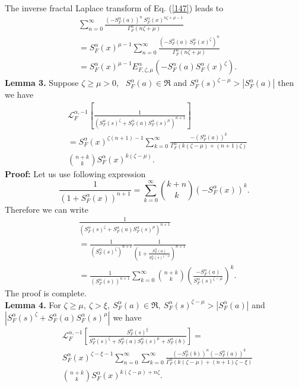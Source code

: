 \documentclass[12pt]{article}
\begin{document}
The inverse fractal Laplace transform of Eq. (\ref{147}) leads to
\begin{align}\label{x}
& \sum_{n=0}^{\infty}\frac{(-S_{F}^{\alpha}(a))^n~ S_{F}^{\alpha}(x)^{n\zeta+\mu-1}}{\Gamma_{F}^{\alpha}(n\zeta+\mu)} \nonumber\\&=S_{F}^{\alpha}(x)^{\mu-1}\sum_{n=0}^{\infty}\frac{(-S_{F}^{\alpha}(a)~S_{F}^{\alpha}(x)^{\zeta})^n}{\Gamma_{F}^{\alpha}(n\zeta+\mu)}\nonumber\\&
 =S_{F}^{\alpha}(x)^{\mu-1}E_{F,\zeta,\mu}^{\alpha}(-S_{F}^{\alpha}(a)S_{F}^{\alpha}(x)^{\zeta}).
\end{align}
\textbf{Lemma 3.} Suppose $\zeta\geq\mu>0$,~  $S_{F}^{\alpha}(a)\in \Re$ and $S_{F}^{\alpha}(s)^{\zeta-\mu}>|S_{F}^{\alpha}(a)|$ then we have
\begin{align}\label{nju159}
  &\mathcal{L}_{F}^{\alpha,-1}\left[\frac{1}{(S_{F}^{\alpha}(s)^{\zeta}+S_{F}^{\alpha}(a)S_{F}^{\alpha}(s)^{\mu})^{n+1}}\right]\nonumber\\&= S_{F}^{\alpha}(x)^{\zeta(n+1)-1}\sum_{k=0}^{\infty}\frac{-(S_{F}^{\alpha}(a))^k}{\Gamma_{F}^{\alpha}(k(\zeta-\mu)+(n+1)\zeta)} \nonumber\\& \binom{n+k}{k} S_{F}^{\alpha}(x)^{k(\zeta-\mu)}.
\end{align}
\textbf{Proof:} Let us use following expression
\begin{equation}\label{2}
  \frac{1}{(1+S_{F}^{\alpha}(x))^{n+1}}=\sum_{k=0}^{\infty} \binom{k+n}{k}(-S_{F}^{\alpha}(x))^k.
\end{equation}
Therefore we can write
\begin{align}
  &\frac{1}{(S_{F}^{\alpha}(s)^{\zeta}+S_{F}^{\alpha}(a)S_{F}^{\alpha}(s)^{\mu})^{n+1}} \nonumber\\&= \frac{1}{(S_{F}^{\alpha}(s)^{\zeta})^{n+1}}\frac{1}{(1+\frac{S_{F}^{\alpha}(a)}{S_{F}^{\alpha}(s)^{\zeta-\mu}})^{n+1}} \nonumber \\&=
   \frac{1}{(S_{F}^{\alpha}(s))^{n+1}}\sum_{k=0}^{\infty}\binom{n+k}{k}\left(\frac{-S_{F}^{\alpha}(a)}{S_{F}^{\alpha}(s)^{\zeta-\mu}}\right)^{k}.\nonumber
\end{align}
The proof is complete.\\
\textbf{Lemma 4.} For $\zeta\geq\mu,~\zeta>\xi,~S_{F}^{\alpha}(a)\in \Re,~S_{F}^{\alpha}(s)^{\zeta-\mu}>|S_{F}^{\alpha}(a)|$ and $|S_{F}^{\alpha}(s)^{\zeta}+S_{F}^{\alpha}(a)S_{F}^{\alpha}(s)^{\mu}|$ we have
\begin{align}\label{xzqa6}
  &\mathcal{L}_{F}^{\alpha,-1}\left[\frac{S_{F}^{\alpha}(s)^{\xi}}{S_{F}^{\alpha}(s)^{\zeta}+S_{F}^{\alpha}(a)S_{F}^{\alpha}(s)^{\mu}+S_{F}^{\alpha}(b)}\right]= \nonumber\\&
  S_{F}^{\alpha}(x)^{\zeta-\xi-1}\sum_{n=0}^{\infty}\sum_{k=0}^{\infty}\frac{(-S_{F}^{\alpha}(b))^n (-S_{F}^{\alpha}(a))^k}{\Gamma_{F}^{\alpha}(k(\zeta-\mu)+(n+1)\zeta-\xi)}\nonumber\\&\binom{n+k}{k}S_{F}^{\alpha}(x)^{k(\zeta-\mu)+n\zeta}.
\end{align}
\end{document}
